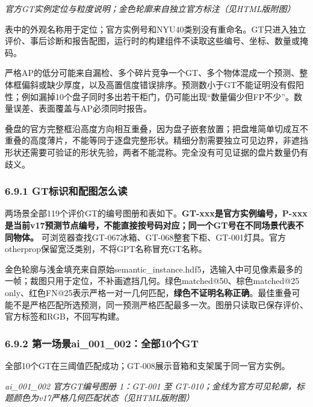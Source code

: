 \documentclass[UTF8,fontset=fandol]{ctexart}
\begin{document}
\textit{官方GT实例定位与粒度说明；金色轮廓来自独立官方标注（见HTML版附图）}



表中的外观名称用于定位；官方实例号和NYU40类别没有重命名。GT只进入独立评价、事后诊断和报告配图，运行时的构建组件不读取这些编号、坐标、数量或掩码。



严格AP的低分可能来自漏检、多个碎片竞争一个GT、多个物体混成一个预测、整体框偏斜或缺少厚度，以及高置信度错误排序。预测数小于GT不能证明没有假阳性；例如漏掉10个盘子同时多出若干柜门，仍可能出现“数量偏少但FP不少”。数量误差、表面覆盖与AP必须同时报告。



叠盘的官方完整框沿高度方向相互重叠，因为盘子嵌套放置；把盘堆简单切成互不重叠的高度薄片，不能等同于逐盘完整形状。精细分割需要独立可见边界，非遮挡形状还需要可验证的形状先验，两者不能混称。完全没有可见证据的盘片数量仍有歧义。



\subsubsection*{6.9.1 GT标识和配图怎么读}

两场景全部119个评价GT的编号图册和表如下。\textbf{GT-xxx是官方实例编号，P-xxx是当前v17预测节点编号，不能直接按号码对应；同一个GT号在不同场景代表不同物体。} 可浏览器查找GT-067冰箱、GT-068整套下柜、GT-001灯具。官方otherprop保留宽泛类别，不将GPT名称冒充GT名称。



金色轮廓与浅金填充来自原始semantic\_instance.hdf5，选输入中可见像素最多的一帧；裁图只用于定位，不补画遮挡几何。绿色matched@50、棕色matched@25 only、红色FN@25表示严格一对一几何匹配，\textbf{绿色不证明名称正确}。最佳重叠可能不是严格匹配所选预测，同一预测严格匹配最多一次。图册只读取已保存评价、官方标签和RGB，不回写构建。



\subsubsection*{6.9.2 第一场景ai\_001\_002：全部10个GT}

全部10个GT在三阈值匹配成功；GT-008展示音箱和支架属于同一官方实例。



\textit{ai\_001\_002 官方GT编号图册 1：GT-001 至 GT-010；金线为官方可见轮廓，标题颜色为v17严格几何匹配状态（见HTML版附图）}
\end{document}

